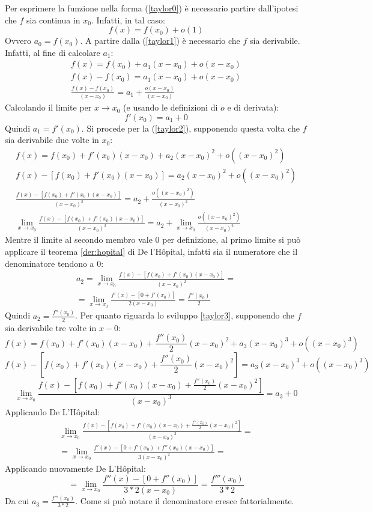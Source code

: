 Per esprimere la funzione nella forma (\ref{taylor0}) è necessario partire dall'ipotesi che $f$ sia continua in $x_0$. Infatti, in tal caso:
\[
	f(x)=f(x_0)+o(1)
\]
Ovvero $a_0=f(x_0)$. A partire dalla (\ref{taylor1}) è necessario che $f$ sia derivabile. Infatti, al fine di calcolare $a_1$:
\begin{gather*}
	f(x)=f(x_0)+a_1(x-x_0)+o(x-x_0)\\
	f(x)-f(x_0)=a_1(x-x_0)+o(x-x_0)\\
	\frac{f(x)-f(x_0)}{(x-x_0)}=a_1+\frac{o(x-x_0)}{(x-x_0)}
\end{gather*}
Calcolando il limite per $x\to x_0$ (e usando le definizioni di $o$ e di derivata):
\[
	f'(x_0)=a_1+0
\]
Quindi $a_1=f'(x_0)$. Si procede per la (\ref{taylor2}), supponendo questa volta che $f$ sia derivabile due volte in $x_0$:
\begin{gather*}
	f(x)=f(x_0)+f'(x_0)(x-x_0)+a_2(x-x_0)^2+o((x-x_0)^2)\\
	f(x)-[f(x_0)+f'(x_0)(x-x_0)]=a_2(x-x_0)^2+o((x-x_0)^2)\\
	\frac{f(x)-[f(x_0)+f'(x_0)(x-x_0)]}{(x-x_0)^2}=a_2+\frac{o((x-x_0)^2)}{(x-x_0)^2}\\
	\lim_{x\to x_0}\frac{f(x)-[f(x_0)+f'(x_0)(x-x_0)]}{(x-x_0)^2}=a_2+\lim_{x\to x_0}\frac{o((x-x_0)^2)}{(x-x_0)^2}
\end{gather*}
Mentre il limite al secondo membro vale $0$ per definizione, al primo limite si può applicare il teorema \ref{der:hopital} di De l'Hôpital, infatti sia il numeratore che il denominatore tendono a $0$:
\begin{gather*}
	a_2=\lim_{x\to x_0}\frac{f(x)-[f(x_0)+f'(x_0)(x-x_0)]}{(x-x_0)^2}=\\
	=\lim_{x\to x_0}\frac{f'(x)-[0+f'(x_0)]}{2(x-x_0)}=\frac{f''(x_0)}{2}
\end{gather*}
Quindi $a_2 = \frac{f''(x_0)}{2}$. Per quanto riguarda lo sviluppo \ref{taylor3}, supponendo che $f$ sia derivabile tre volte in $x-0$:
\begin{dmath*}
	f(x) = f(x_0)+f'(x_0)(x-x_0)+\frac{f''(x_0)}{2}(x-x_0)^2+a_3(x-x_0)^3+o((x-x_0)^3)
\end{dmath*}
\begin{dmath*}
	f(x)-\left[f(x_0)+f'(x_0)(x-x_0) + \frac{f''(x_0)}{2}(x-x_0)^2\right] = a_3(x-x_0)^3+o((x-x_0)^3)
\end{dmath*}
\begin{equation*}
	\lim_{x\to x_0}\frac{f(x)-\left[f(x_0)+f'(x_0)(x-x_0)+\frac{f''(x_0)}{2}(x-x_0)^2\right]}{(x-x_0)^3}=a_3+0
\end{equation*}
Applicando De L'Hôpital:
\begin{gather*}
	\lim_{x\to x_0}\frac{f(x)-\left[f(x_0)+f'(x_0)(x-x_0)+\frac{f''(x_0)}{2}(x-x_0)^2\right]}{(x-x_0)^3}=\\
	=\lim_{x\to x_0}\frac{f'(x)-\left[0+f'(x_0)+f''(x_0)(x-x_0)\right]}{3(x-x_0)^2}=
\end{gather*}
Applicando nuovamente De L'Hôpital:
\[
	=\lim_{x\to x_0}\frac{f''(x)-[0+f''(x_0)]}{3*2(x-x_0)}=\frac{f'''(x_0)}{3*2}
\]
Da cui $a_3=\frac{f'''(x_0)}{3*2}$. Come si può notare il denominatore cresce fattorialmente.

